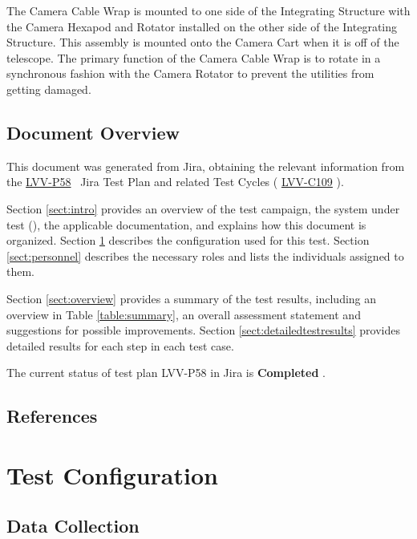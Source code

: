\documentclass[SE,STR,toc]{lsstdoc}
\begin{document}
 The Camera Cable Wrap is mounted to one side of the Integrating
Structure with the Camera Hexapod and Rotator installed on the other
side of the Integrating Structure. This assembly is mounted onto the
Camera Cart when it is off of the telescope. The primary function of the
Camera Cable Wrap is to rotate in a synchronous fashion with the Camera
Rotator to prevent the utilities from getting damaged.


\subsection{Document Overview}
\label{sect:docoverview}

This document was generated from Jira, obtaining the relevant information from the 
\href{https://jira.lsstcorp.org/secure/Tests.jspa#/testPlan/LVV-P58}{LVV-P58}
~Jira Test Plan and related Test Cycles (
  \href{https://jira.lsstcorp.org/secure/Tests.jspa#/testCycle/LVV-C109}{LVV-C109}
).

Section \ref{sect:intro} provides an overview of the test campaign, the system under test (\product{}), the applicable documentation, and explains how this document is organized.
Section \ref{sect:configuration}  describes the configuration used for this test.
Section \ref{sect:personnel} describes the necessary roles and lists the individuals assigned to them.

Section \ref{sect:overview} provides a summary of the test results, including an overview in Table \ref{table:summary}, an overall assessment statement and suggestions for possible improvements.
Section \ref{sect:detailedtestresults} provides detailed results for each step in each test case.

The current status of test plan LVV-P58 in Jira is \textbf{ Completed }.

\subsection{References}
\label{sect:references}
\renewcommand{\refname}{}

\section{Test Configuration}
\label{sect:configuration}

\subsection{Data Collection}
\end{document}
